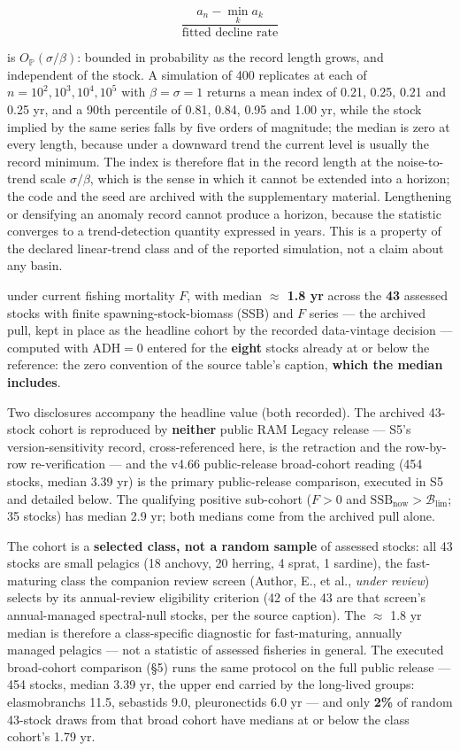 \documentclass[11pt]{article}
\begin{document}
$$\frac{a_n-\min_ka_k}{\text{fitted decline rate}}$$

 is \(O_{\mathbb P}(\sigma/\beta)\): bounded in probability as the record length grows, and independent of the stock. A simulation of 400 replicates at each of \(n=10^2,10^3,10^4,10^5\) with \(\beta=\sigma=1\) returns a mean index of 0.21, 0.25, 0.21 and 0.25 yr, and a 90th percentile of 0.81, 0.84, 0.95 and 1.00 yr, while the stock implied by the same series falls by five orders of magnitude; the median is zero at every length, because under a downward trend the current level is usually the record minimum. The index is therefore flat in the record length at the noise-to-trend scale \(\sigma/\beta\), which is the sense in which it cannot be extended into a horizon; the code and the seed are archived with the supplementary material. Lengthening or densifying an anomaly record cannot produce a horizon, because the statistic converges to a trend-detection quantity expressed in years. This is a property of the declared linear-trend class and of the reported simulation, not a claim about any basin.

\vspace{0.8em}

under current fishing mortality \(F\), with median \textbf{\ensuremath{\approx} 1.8 yr} across the \textbf{43} assessed stocks with finite spawning-stock-biomass (SSB) and \(F\) series --- the archived pull, kept in place as the headline cohort by the recorded data-vintage decision --- computed with \(\mathrm{ADH}=0\) entered for the \textbf{eight} stocks already at or below the reference: the zero convention of the source table's caption, \textbf{which the median includes}.

Two disclosures accompany the headline value (both recorded). The archived 43-stock cohort is reproduced by \textbf{neither} public RAM Legacy release --- S5's version-sensitivity record, cross-referenced here, is the retraction and the row-by-row re-verification --- and the v4.66 public-release broad-cohort reading (454 stocks, median 3.39 yr) is the primary public-release comparison, executed in S5 and detailed below. The qualifying positive sub-cohort (\(F>0\) and \(\mathrm{SSB}_{\mathrm{now}}>\mathcal B_{\mathrm{lim}}\); 35 stocks) has median 2.9 yr; both medians come from the archived pull alone.

The cohort is a \textbf{selected class, not a random sample} of assessed stocks: all 43 stocks are small pelagics (18 anchovy, 20 herring, 4 sprat, 1 sardine), the fast-maturing class the companion review screen (Author, E., et al., \emph{under review}) selects by its annual-review eligibility criterion (42 of the 43 are that screen's annual-managed spectral-null stocks, per the source caption). The \ensuremath{\approx} 1.8 yr median is therefore a class-specific diagnostic for fast-maturing, annually managed pelagics --- not a statistic of assessed fisheries in general. The executed broad-cohort comparison (\S5) runs the same protocol on the full public release --- 454 stocks, median 3.39 yr, the upper end carried by the long-lived groups: elasmobranchs 11.5, sebastids 9.0, pleuronectids 6.0 yr --- and only \textbf{2\%} of random 43-stock draws from that broad cohort have medians at or below the class cohort's 1.79 yr.
\end{document}

